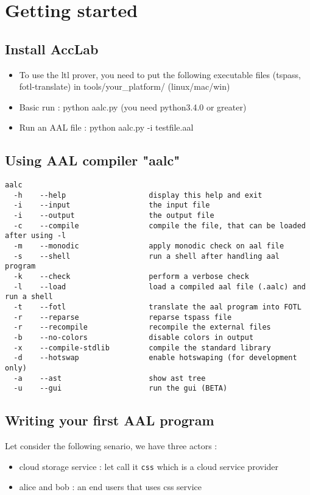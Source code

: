 \section{Getting started}

\subsection{Install AccLab}
\begin{itemize}
  \item To use the ltl prover, you need to put the following executable files (tspass, fotl-translate) in tools/your\_platform/ (linux/mac/win)
  \item Basic run : python aalc.py (you need python3.4.0 or greater)
  \item Run an AAL file : python aalc.py -i testfile.aal
\end{itemize}


\subsection{Using AAL compiler "aalc"}
{\lstset{style=shell}
\begin{lstlisting}[caption={aalc options}]
aalc 
  -h    --help                   display this help and exit
  -i    --input                  the input file
  -i    --output                 the output file
  -c    --compile                compile the file, that can be loaded after using -l
  -m    --monodic                apply monodic check on aal file
  -s    --shell                  run a shell after handling aal program
  -k    --check                  perform a verbose check
  -l    --load                   load a compiled aal file (.aalc) and run a shell
  -t    --fotl                   translate the aal program into FOTL
  -r    --reparse                reparse tspass file
  -r    --recompile              recompile the external files
  -b    --no-colors              disable colors in output
  -x    --compile-stdlib         compile the standard library
  -d    --hotswap                enable hotswaping (for development only)
  -a    --ast                    show ast tree
  -u    --gui                    run the gui (BETA)
\end{lstlisting}
}

\subsection{Writing your first AAL program}
Let consider the following senario, we have three actors :
\begin{itemize}
    \item cloud storage service : let call it \texttt{css} which is a cloud service provider
    \item alice and bob : an end users that uses css service
\end{itemize}

